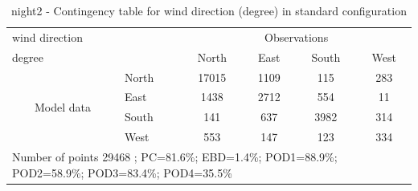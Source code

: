 \begin{table}[p!]
\begin{center}
\begin{tabular}{llcccc}
\hline
{wind direction}                                       &                             &    \multicolumn{4}{c}{Observations}                 \\
{degree}                                       &                             & {North}   & {East} & {South} & {West} \\
\hline
\multicolumn{1}{c}{\multirow{4}{*}{Model data}}  & {North}                    & 17015   & 1109    & 115     & 283\\
                                                 & {East}                     & 1438   & 2712    & 554     & 11\\
                                                 & {South}                    & 141   & 637   & 3982    & 314\\
                                                 & {West}                     & 553  & 147   & 123    & 334\\
\hline 
\multicolumn{6}{l}{ Number of points        29468 ; PC=81.6\%; EBD=1.4\%; POD1=88.9\%; POD2=58.9\%; POD3=83.4\%; POD4=35.5\%}                 \\
\end{tabular}
\end{center}
\caption{night2 - Contingency table for {wind direction} (degree) in standard configuration}
\label{tab:contingencywdBEF:night2}
\end{table}
